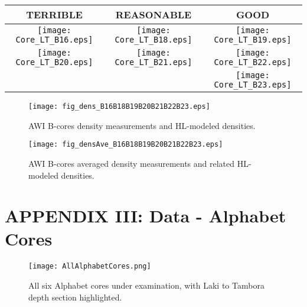 \documentclass[../../CompleteThesis2/Complete_2ndDraft.tex]{subfiles}
\begin{document}
	
	\newpage
	\begin{rotatepage}
		\begin{landscape}
			\begin{table}
				\centering
				\begin{tabular}{c||c||c}
					\textcolor{BrickRed}{\textbf{TERRIBLE}} & \textcolor{YellowOrange}{\textbf{REASONABLE}} & \textcolor{OliveGreen}{\textbf{GOOD}} \\
					\hline
					\texttt{[image: Core\_LT\_B16.eps]} & \texttt{[image: Core\_LT\_B18.eps]} & \texttt{[image: Core\_LT\_B19.eps]} \\
					\texttt{[image: Core\_LT\_B20.eps]} & \texttt{[image: Core\_LT\_B21.eps]} & \texttt{[image: Core\_LT\_B22.eps]} \\	
					& & \texttt{[image: Core\_LT\_B23.eps]} \\
				\end{tabular}
			\end{table}
		\end{landscape}
	\end{rotatepage}
	\newpage
	
	\begin{rotatepage}
		\begin{landscape}
			\begin{figure}[h]
				\centering
				\texttt{[image: fig\_dens\_B16B18B19B20B21B22B23.eps]}
				\label{fig:dens}
				\caption{AWI B-cores density measurements and HL-modeled densities.}
			\end{figure}
		\end{landscape}
	\end{rotatepage}
	\newpage
	\begin{rotatepage}
		\begin{landscape}
			\begin{figure}[h]
				\centering
				\texttt{[image: fig\_densAve\_B16B18B19B20B21B22B23.eps]}
				\label{fig:densAve}
				\caption{AWI B-cores averaged density measurements and related HL-modeled densities.}
			\end{figure}
		\end{landscape}
	\end{rotatepage}
	
	
	
	\newpage
	\section[Appendix III]{APPENDIX III: Data - Alphabet Cores}
	\label{AppIII:Data_Alphabet}
	\begin{figure}[h]
		\centering
		\texttt{[image: AllAlphabetCores.png]}
		\caption[]{All six Alphabet cores under examination, with Laki to Tambora depth section highlighted.}
		\label{fig:AllAlphabetCores}
	\end{figure}
	
\end{document}
